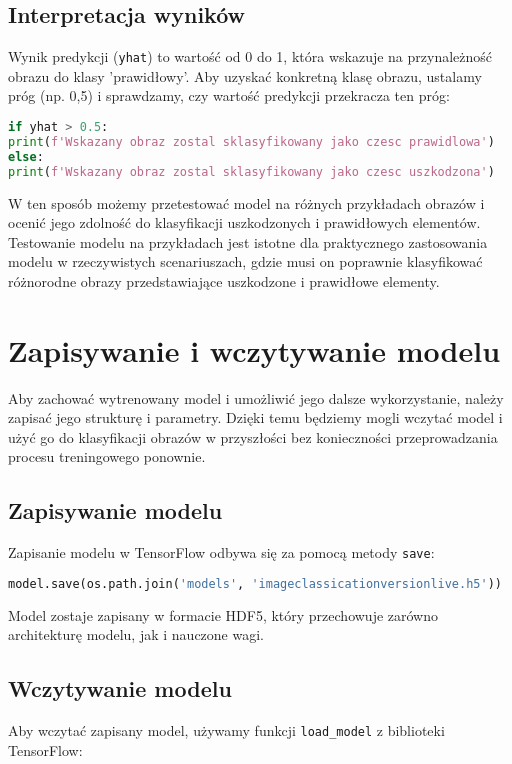 \subsection{Interpretacja wyników}
Wynik predykcji (\texttt{yhat}) to wartość od 0 do 1, która wskazuje na przynależność obrazu do klasy 'prawidłowy'. Aby uzyskać konkretną klasę obrazu, ustalamy próg (np. 0,5) i sprawdzamy, czy wartość predykcji przekracza ten próg:

\begin{lstlisting}[language=Python]
if yhat > 0.5:
print(f'Wskazany obraz zostal sklasyfikowany jako czesc prawidlowa')
else:
print(f'Wskazany obraz zostal sklasyfikowany jako czesc uszkodzona')
\end{lstlisting}

W ten sposób możemy przetestować model na różnych przykładach obrazów i ocenić jego zdolność do klasyfikacji uszkodzonych i prawidłowych elementów. Testowanie modelu na przykładach jest istotne dla praktycznego zastosowania modelu w rzeczywistych scenariuszach, gdzie musi on poprawnie klasyfikować różnorodne obrazy przedstawiające uszkodzone i prawidłowe elementy.

\section{Zapisywanie i wczytywanie modelu}
Aby zachować wytrenowany model i umożliwić jego dalsze wykorzystanie, należy zapisać jego strukturę i parametry. Dzięki temu będziemy mogli wczytać model i użyć go do klasyfikacji obrazów w przyszłości bez konieczności przeprowadzania procesu treningowego ponownie.

\subsection{Zapisywanie modelu}
Zapisanie modelu w TensorFlow odbywa się za pomocą metody \texttt{save}:

\begin{lstlisting}[language=Python]
model.save(os.path.join('models', 'imageclassicationversionlive.h5'))
\end{lstlisting}

Model zostaje zapisany w formacie HDF5, który przechowuje zarówno architekturę modelu, jak i nauczone wagi.

\subsection{Wczytywanie modelu}
Aby wczytać zapisany model, używamy funkcji \texttt{load\_model} z biblioteki TensorFlow:

